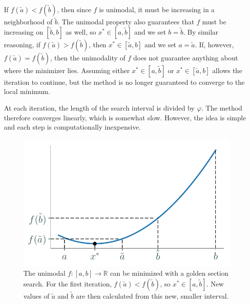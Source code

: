 If $f(\tilde{a}) < f(\tilde{b})$, then since $f$ is unimodal, it must be increasing in a neighborhood of $\tilde{b}$.
The unimodal property also guarantees that $f$ must be increasing on $[\tilde{b}, b]$ as well, so $x^* \in [a, \tilde{b}]$ and we set $b = \tilde{b}$.
By similar reasoning, if $f(\tilde{a}) > f(\tilde{b})$, then $x^* \in [\tilde{a}, b]$ and we set $a = \tilde{a}$.
If, however, $f(\tilde{a}) = f(\tilde{b})$, then the unimodality of $f$ does not guarantee anything about where the minimizer lies.
Assuming either $x^*\in [a, \tilde{b}]$ or $x^* \in [\tilde{a}, b]$ allows the iteration to continue, but the method is no longer guaranteed to converge to the local minimum.

At each iteration, the length of the search interval is divided by $\varphi$.
The method therefore converges linearly, which is somewhat slow.
However, the idea is simple and each step is computationally inexpensive.

\begin{figure}[H] %
    \centering
    \includegraphics[width=.7\textwidth]{golden_section.pdf}
    \caption{The unimodal $f:[a,b]\rightarrow\mathbb{R}$ can be minimized with a golden section search.
    For the first iteration, $f(\tilde{a}) < f(\tilde{b})$, so $x^* \in [a, \tilde{b}]$.
    New values of $\tilde{a}$ and $\tilde{b}$ are then calculated from this new, smaller interval.}
    \label{fig:1dopt-golden-unimodal}
\end{figure}

